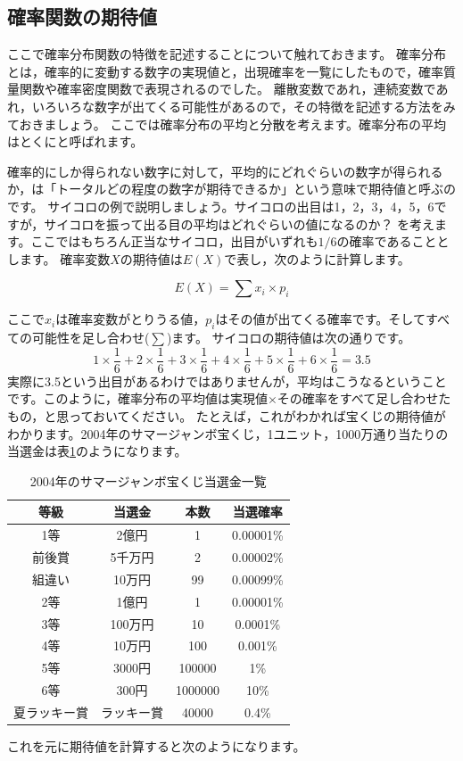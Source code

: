 \documentclass{ltjbook}
\begin{document}
\subsection{確率関数の期待値}
\label{expectation}
ここで確率分布関数の特徴を記述することについて触れておきます。
確率分布とは，確率的に変動する数字の実現値と，出現確率を一覧にしたもので，確率質量関数や確率密度関数で表現されるのでした。
離散変数であれ，連続変数であれ，いろいろな数字が出てくる可能性があるので，その特徴を記述する方法をみておきましょう。
ここでは確率分布の平均と分散を考えます。確率分布の平均はとくにと呼ばれます。

確率的にしか得られない数字に対して，平均的にどれぐらいの数字が得られるか，は「トータルどの程度の数字が期待できるか」という意味で期待値と呼ぶのです。
サイコロの例で説明しましょう。サイコロの出目は1，2，3，4，5，6ですが，サイコロを振って出る目の平均はどれぐらいの値になるのか？ を考えます。ここではもちろん正当なサイコロ，出目がいずれも$1/6$の確率であることとします。
確率変数$X$の期待値は$E(X)$で表し，次のように計算します。

\[ E(X) = \sum x_i \times p_i \]

ここで$x_i$は確率変数がとりうる値，$p_i$はその値が出てくる確率です。そしてすべての可能性を足し合わせ($\sum$)ます。
サイコロの期待値は次の通りです。
\[1\times\frac{1}{6}+
	2\times\frac{1}{6}+
	3\times\frac{1}{6}+
	4\times\frac{1}{6}+
	5\times\frac{1}{6}+
	6\times\frac{1}{6}
	=3.5\]
実際に3.5という出目があるわけではありませんが，平均はこうなるということです。このように，確率分布の平均値は実現値$\times$その確率をすべて足し合わせたもの，と思っておいてください。
たとえば，これがわかれば宝くじの期待値がわかります。2004年のサマージャンボ宝くじ，1ユニット，1000万通り当たりの当選金は表\ref{takarakuji}のようになります。


\begin{table}[hb]
	\centering
	\caption{2004年のサマージャンボ宝くじ当選金一覧}
	\begin{tabular}{cccc}
		等級     & 当選金   & 本数      & 当選確率      \\\hline
		1等     & 2億円   & 1       & 0.00001\% \\
		前後賞    & 5千万円  & 2       & 0.00002\% \\
		組違い    & 10万円  & 99      & 0.00099\% \\
		2等     & 1億円   & 1       & 0.00001\% \\
		3等     & 100万円 & 10      & 0.0001\%  \\
		4等     & 10万円  & 100     & 0.001\%   \\
		5等     & 3000円 & 100000  & 1\%       \\
		6等     & 300円  & 1000000 & 10\%      \\
		夏ラッキー賞 & ラッキー賞 & 40000   & 0.4\%     \\
	\end{tabular}
	\label{takarakuji}
\end{table}
これを元に期待値を計算すると次のようになります。
\end{document}
